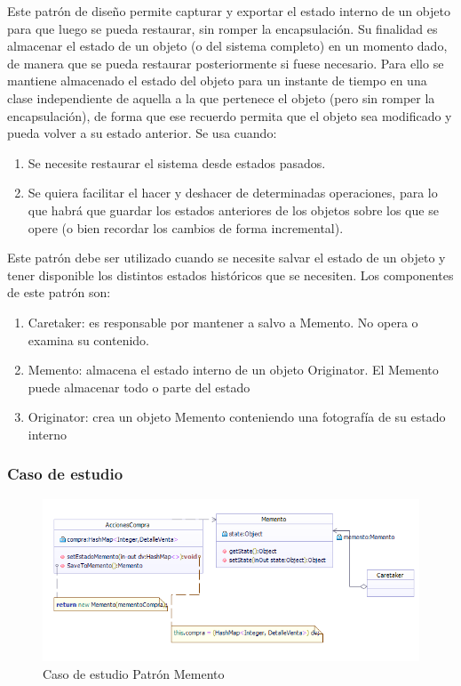 Este patrón de diseño permite capturar y exportar el estado interno de un objeto para que luego se pueda restaurar, sin romper la encapsulación.
Su finalidad es almacenar el estado de un objeto (o del sistema completo) en un momento dado, de manera que se pueda restaurar posteriormente si fuese necesario. Para ello se mantiene almacenado el estado del objeto para un instante de tiempo en una clase independiente de aquella a la que pertenece el objeto (pero sin romper la encapsulación), de forma que ese recuerdo permita que el objeto sea modificado y pueda volver a su estado anterior.
\newline
Se usa cuando:
\begin{enumerate}
	\item Se necesite restaurar el sistema desde estados pasados.
	\item Se quiera facilitar el hacer y deshacer de determinadas operaciones, para lo que habrá que guardar los estados anteriores de los objetos sobre los que se opere (o bien recordar los cambios de forma incremental).
\end{enumerate}
Este patrón debe ser utilizado cuando se necesite salvar el estado de un objeto y tener disponible los distintos estados históricos que se necesiten.
\newline
Los componentes de este patrón son:
\begin{enumerate}
	\item Caretaker: es responsable por mantener a salvo a Memento. No opera o examina su contenido.
	\item Memento: almacena el estado interno de un objeto Originator. El Memento puede almacenar todo o parte del estado
	\item Originator: crea un objeto Memento conteniendo una fotografía de su estado interno
\end{enumerate}

\subsubsection{Caso de estudio}
\begin{figure}[h!]
	\centering
	\includegraphics[width=0.7\linewidth]{arquitectura/imagenes/PatronMementoCasoEstudio}
	\caption{Caso de estudio Patrón Memento}
	\label{fig:Caso de estudio Patrón Memento}
\end{figure}

